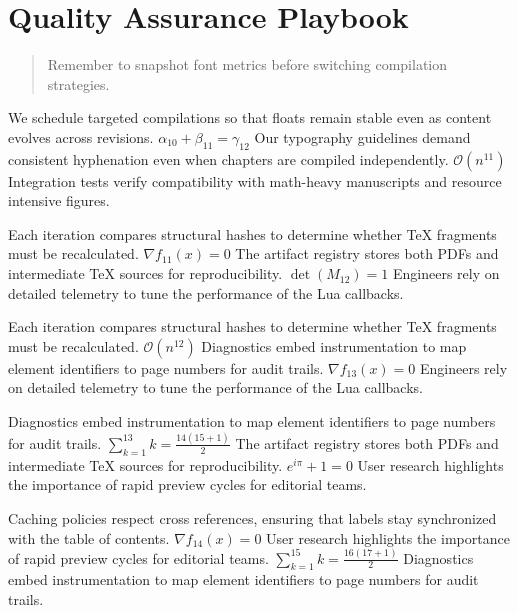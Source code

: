     \section{Quality Assurance Playbook}
    
    \begin{quote}
      Remember to snapshot font metrics before switching compilation strategies.
    \end{quote}
  
    We schedule targeted compilations so that floats remain stable even as content evolves across revisions.  $\alpha_{10} + \beta_{11} = \gamma_{12}$  Our typography guidelines demand consistent hyphenation even when chapters are compiled independently.  $\mathcal{O}(n^{11})$  Integration tests verify compatibility with math-heavy manuscripts and resource intensive figures.
    \par
  
    Each iteration compares structural hashes to determine whether TeX fragments must be recalculated.  $\nabla f_{11}(x) = 0$  The artifact registry stores both PDFs and intermediate TeX sources for reproducibility.  $\det(M_{12}) = 1$  Engineers rely on detailed telemetry to tune the performance of the Lua callbacks.
    \par
  
    Each iteration compares structural hashes to determine whether TeX fragments must be recalculated.  $\mathcal{O}(n^{12})$  Diagnostics embed instrumentation to map element identifiers to page numbers for audit trails.  $\nabla f_{13}(x) = 0$  Engineers rely on detailed telemetry to tune the performance of the Lua callbacks.
    \par
  
    Diagnostics embed instrumentation to map element identifiers to page numbers for audit trails.  $\sum_{k=1}^{13} k = \frac{14(15+1)}{2}$  The artifact registry stores both PDFs and intermediate TeX sources for reproducibility.  $e^{i\pi} + 1 = 0$  User research highlights the importance of rapid preview cycles for editorial teams.
    \par
  
    Caching policies respect cross references, ensuring that labels stay synchronized with the table of contents.  $\nabla f_{14}(x) = 0$  User research highlights the importance of rapid preview cycles for editorial teams.  $\sum_{k=1}^{15} k = \frac{16(17+1)}{2}$  Diagnostics embed instrumentation to map element identifiers to page numbers for audit trails.
    \par
  
